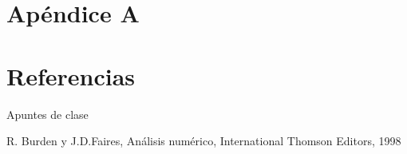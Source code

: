 \documentclass[a4paper]{article}
\begin{document}
\newpage
\section{Apéndice A}
\label{sec:ApA}



\newpage

\section{Referencias}
\label{sec:ref}

Apuntes de clase

R. Burden y J.D.Faires, Análisis numérico, International Thomson Editors, 1998
\end{document}
